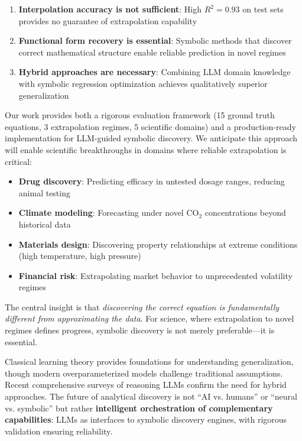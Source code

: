 \begin{enumerate}
\item \textbf{Interpolation accuracy is not sufficient}: High $R^2 = 0.93$ on test sets provides no guarantee of extrapolation capability
\item \textbf{Functional form recovery is essential}: Symbolic methods that discover correct mathematical structure enable reliable prediction in novel regimes
\item \textbf{Hybrid approaches are necessary}: Combining LLM domain knowledge with symbolic regression optimization achieves qualitatively superior generalization
\end{enumerate}

Our work provides both a rigorous evaluation framework (15 ground truth equations, 3 extrapolation regimes, 5 scientific domains) and a production-ready implementation for LLM-guided symbolic discovery. We anticipate this approach will enable scientific breakthroughs in domains where reliable extrapolation is critical:

\begin{itemize}
\item \textbf{Drug discovery}: Predicting efficacy in untested dosage ranges, reducing animal testing
\item \textbf{Climate modeling}: Forecasting under novel CO$_2$ concentrations beyond historical data
\item \textbf{Materials design}: Discovering property relationships at extreme conditions (high temperature, high pressure)
\item \textbf{Financial risk}: Extrapolating market behavior to unprecedented volatility regimes
\end{itemize}

The central insight is that \emph{discovering the correct equation is fundamentally different from approximating the data}. For science, where extrapolation to novel regimes defines progress, symbolic discovery is not merely preferable---it is essential.

Classical learning theory \citep{vapnik1999overview,bishop2006pattern,goodfellow2016deep} provides foundations for understanding generalization, though modern overparameterized models challenge traditional assumptions. Recent comprehensive surveys \citep{zhang2025survey} of reasoning LLMs confirm the need for hybrid approaches. The future of analytical discovery is not ``AI vs. humans'' or ``neural vs. symbolic'' but rather \textbf{intelligent orchestration of complementary capabilities}: LLMs as interfaces to symbolic discovery engines, with rigorous validation ensuring reliability.

